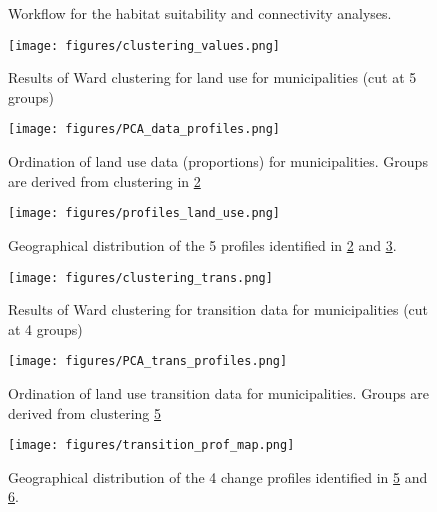 \begin{figure}[h!]
\caption{Workflow for the habitat suitability and connectivity analyses.} 
\label{fig:workflow2}
\end{figure}
\clearpage


\begin{figure}[h!]
\centering
 \texttt{[image: figures/clustering\_values.png]}
 \caption{Results of Ward clustering for land use for municipalities (cut at 5 groups)}
 \label{fig:clustervals}
\end{figure}

\begin{figure}[h!]
  \centering
    \texttt{[image: figures/PCA\_data\_profiles.png]}
  \caption{Ordination of land use data (proportions) for municipalities. Groups are derived from clustering in \ref{fig:clustervals}}
  \label{fig:PCAvals}
\end{figure}

\begin{figure}[h!]
  \centering
    \texttt{[image: figures/profiles\_land\_use.png]}
  \caption{Geographical distribution of the 5 profiles identified in \ref{fig:clustervals} and \ref{fig:PCAvals}.}
  \label{fig:mapvals}
\end{figure}

\begin{figure}[h!]
  \centering
    \texttt{[image: figures/clustering\_trans.png]}
  \caption{Results of Ward clustering for transition data for municipalities (cut at 4 groups)}
  \label{fig:clustertrans}
\end{figure}

\begin{figure}[h!]
  \centering
    \texttt{[image: figures/PCA\_trans\_profiles.png]}
  \caption{Ordination of land use transition data for municipalities. Groups are derived from clustering \ref{fig:clustertrans}}
  \label{fig:PCAtrans}
\end{figure}

\begin{figure}[h!]
  \centering
    \texttt{[image: figures/transition\_prof\_map.png]}
  \caption{Geographical distribution of the 4 change profiles identified in \ref{fig:clustertrans} and \ref{fig:PCAtrans}.}
  \label{fig:maptrans}
\end{figure}

